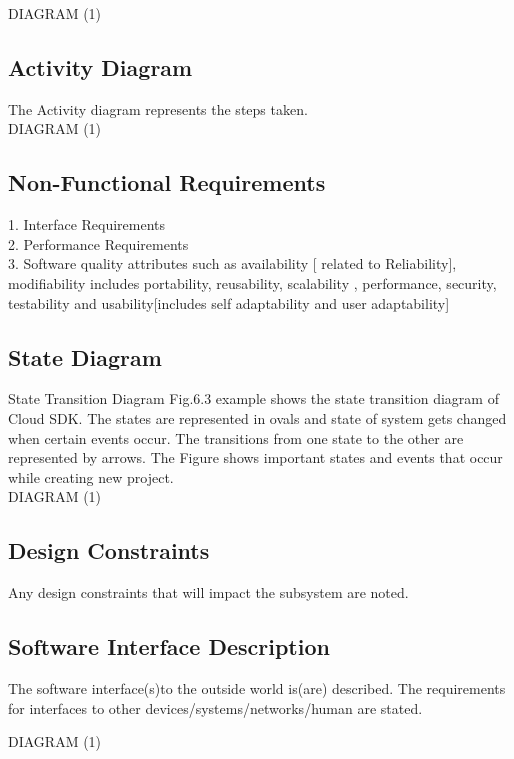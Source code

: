 \documentclass{report} %
\begin{document}
			DIAGRAM (1)
			
			\subsection{Activity Diagram}
			The Activity diagram represents the steps taken. \\
			
			DIAGRAM (1)
			
			\subsection{Non-Functional Requirements}
			1. Interface Requirements \\
			2. Performance Requirements \\
			3. Software quality attributes such as availability [ related to Reliability], modifiability includes portability, reusability, scalability , performance, security, testability and usability[includes self adaptability and user adaptability] \\
		
			\subsection{State Diagram}
			State Transition Diagram
			Fig.6.3 example shows the state transition diagram of Cloud SDK. The states are
			represented in ovals and state of system gets changed when certain events occur.
			The transitions from one state to the other are represented by arrows. The Figure
			shows important states and events that occur while creating new project. \\
			
			DIAGRAM (1)
			
			\subsection{Design Constraints}
			Any design constraints that will impact the subsystem are noted.
			
			\subsection{Software Interface Description}
			The software interface(s)to the outside world is(are) described. The requirements for interfaces to other devices/systems/networks/human are stated.
			
			DIAGRAM (1)

			
\end{document}
